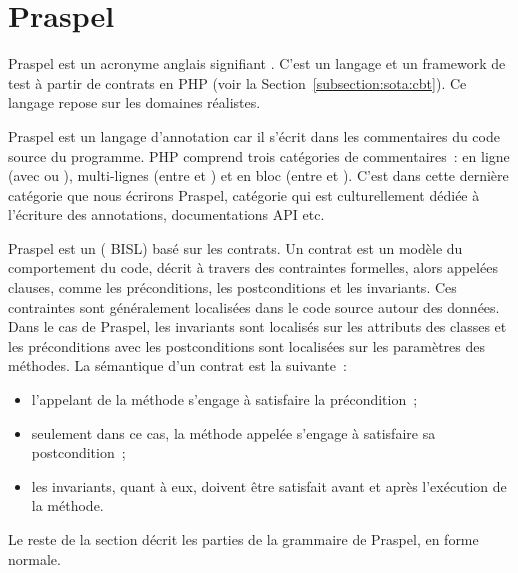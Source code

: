\def\gsep{$\quad::=\quad$}
\def\mvert{$\;\;|\;\;$}
\newcommand{\gtoken}[1]{\underline{\code{php-#1}}}
\newcommand{\grule}[1]{\textit{#1}}

\section{Praspel}
\label{section:language:praspel}

Praspel est un acronyme anglais signifiant . C'est un langage et un framework de test à partir
de contrats en PHP (voir la Section~\ref{subsection:sota:cbt}). Ce langage
repose sur les domaines réalistes.

Praspel est un {\strong langage d'annotation} car il s'écrit dans les
commentaires du code source du programme. PHP comprend trois catégories de
commentaires~: en ligne (avec \code{//} ou \code{\#}), multi-lignes (entre
\code{/*} et \code{*/}) et en bloc (entre \code{/**} et \code{*/}). C'est dans
cette dernière catégorie que nous écrirons Praspel, catégorie qui est
culturellement dédiée à l'écriture des annotations, documentations API etc.

Praspel est un  ({\strong
BISL}) basé sur les contrats. Un {\strong contrat} est un modèle du comportement
du code, décrit à travers des contraintes formelles, alors appelées {\strong
clauses}, comme les préconditions, les postconditions et les invariants. Ces
contraintes sont généralement localisées dans le code source autour des données.
Dans le cas de Praspel, les invariants sont localisés sur les attributs des
classes et les préconditions avec les postconditions sont localisées sur les
paramètres des méthodes. La sémantique d'un contrat est la suivante~:

\begin{itemize}

\item l'appelant de la méthode s'engage à satisfaire la précondition~;

\item seulement dans ce cas, la méthode appelée s'engage à satisfaire sa
postcondition~;

\item les invariants, quant à eux, doivent être satisfait avant et après
l'exécution de la méthode.

\end{itemize}

Le reste de la section décrit les parties de la grammaire de Praspel, en forme
normale.

